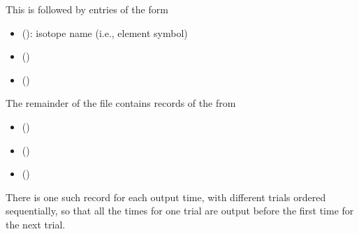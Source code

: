 \documentclass[letterpaper,10pt,english]{sphinxmanual}
\begin{document}
This is followed by  entries of the form
\begin{itemize}
\item {} 
 (): isotope name (i.e., element symbol)

\item {} 
 ()

\item {} 
 ()

\end{itemize}

The remainder of the file contains records of the from
\begin{itemize}
\item {} 
 ()

\item {} 
 ()

\item {} 
 ()

\end{itemize}

There is one such record for each output time, with different trials
ordered sequentially, so that all the times for one trial are output
before the first time for the next trial.
\end{document}

